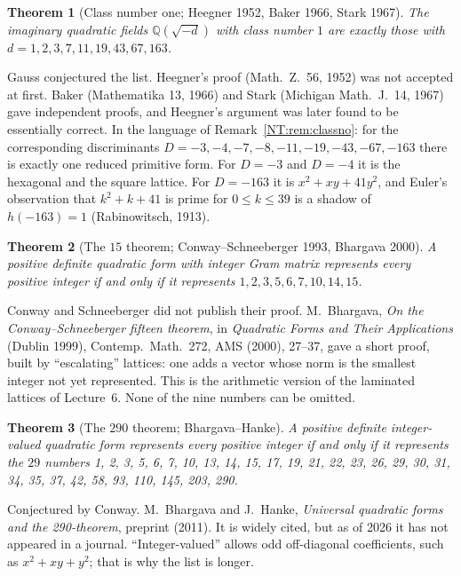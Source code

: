 \documentclass[11pt,openany]{book}
\theoremstyle{plain}
\newtheorem{theorem}{Theorem}[chapter]
\theoremstyle{definition}
\theoremstyle{remark}
\newcommand{\Q}{\mathbb{Q}}
\begin{document}
\begin{theorem}[Class number one; Heegner 1952, Baker 1966, Stark 1967]\label{NT:gal:classno}
The imaginary quadratic fields $\Q(\sqrt{-d})$ with class number $1$ are exactly those with
$d=1,2,3,7,11,19,43,67,163$.
\end{theorem}
Gauss conjectured the list. Heegner's proof (Math.\ Z.\ 56, 1952) was not accepted at first. Baker
(Mathematika 13, 1966) and Stark (Michigan Math.\ J.\ 14, 1967) gave independent proofs, and Heegner's
argument was later found to be essentially correct. In the language of Remark~\ref{NT:rem:classno}: for the
corresponding discriminants $D=-3,-4,-7,-8,-11,-19,-43,-67,-163$ there is exactly one reduced primitive form.
For $D=-3$ and $D=-4$ it is the hexagonal and the square lattice. For $D=-163$ it is $x^2+xy+41y^2$, and
Euler's observation that $k^2+k+41$ is prime for $0\le k\le39$ is a shadow of $h(-163)=1$ (Rabinowitsch, 1913).

\begin{theorem}[The $15$ theorem; Conway--Schneeberger 1993, Bhargava 2000]\label{NT:gal:15}
A positive definite quadratic form with integer Gram matrix represents every positive integer if and only if it
represents $1,2,3,5,6,7,10,14,15$.
\end{theorem}
Conway and Schneeberger did not publish their proof. M.~Bhargava, \emph{On the Conway--Schneeberger
fifteen theorem}, in \emph{Quadratic Forms and Their Applications} (Dublin 1999), Contemp.\ Math.\ 272,
AMS (2000), 27--37, gave a short proof, built by ``escalating'' lattices: one adds a vector whose
norm is the smallest integer not yet represented. This is the arithmetic version of the laminated
lattices of Lecture~6. None of the nine numbers can be omitted.

\begin{theorem}[The $290$ theorem; Bhargava--Hanke]\label{NT:gal:290}
A positive definite integer-valued quadratic form represents every positive integer if and only if it
represents
the $29$ numbers 1, 2, 3, 5, 6, 7, 10, 13, 14, 15, 17, 19, 21, 22, 23, 26, 29, 30, 31, 34, 35, 37, 42, 58, 93,
110, 145, 203, 290.
\end{theorem}
Conjectured by Conway. M.~Bhargava and J.~Hanke, \emph{Universal quadratic forms and the 290-theorem},
preprint (2011). It is widely cited, but as of 2026 it has not appeared in a journal.
``Integer-valued'' allows odd off-diagonal coefficients, such as $x^2+xy+y^2$; that is why the list is longer.
\end{document}
